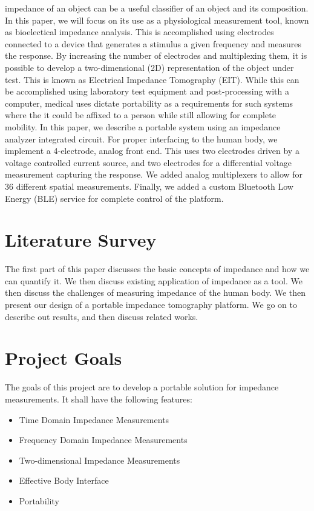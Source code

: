 \documentclass[]{IEEEtran}
\begin{document}
 impedance of an object can be a useful classifier of an object and its composition. In this paper, we will focus on its use as a physiological measurement tool, known as bioelectical impedance analysis. This is accomplished using electrodes connected to a device that generates a stimulus a given frequency and measures the response. By increasing the number of electrodes and multiplexing them, it is possible to develop a two-dimensional (2D) representation of the object under test. This is known as Electrical Impedance Tomography (EIT). While this can be accomplished using laboratory test equipment and post-processing with a computer, medical uses dictate portability as a requirements for such systems where the it could be affixed to a person while still allowing for complete mobility. In this paper, we describe a portable system using an impedance analyzer integrated circuit. For proper interfacing to the human body, we implement a 4-electrode, analog front end. This uses two electrodes driven by a voltage controlled current source, and two electrodes for a differential voltage measurement capturing the response. We added analog multiplexers to allow for 36 different spatial measurements. Finally, we added a custom Bluetooth Low Energy (BLE) service for complete control of the platform. 
\newline 

\section{Literature Survey}
The first part of this paper discusses the basic concepts of impedance and how we can quantify it. We then discuss existing application of impedance as a tool.  We then discuss the challenges of measuring impedance of the human body. We then present our design of a portable impedance tomography platform. We go on to describe out results, and then discuss related works. 



\section{Project Goals}
The goals of this project are to develop a portable solution for impedance measurements. It shall have the following features:
\begin{itemize}
\item{Time Domain Impedance Measurements}
\item{Frequency Domain Impedance Measurements}
\item{Two-dimensional Impedance Measurements}
\item{Effective Body Interface}
\item{Portability}
\end{itemize}
\end{document}
